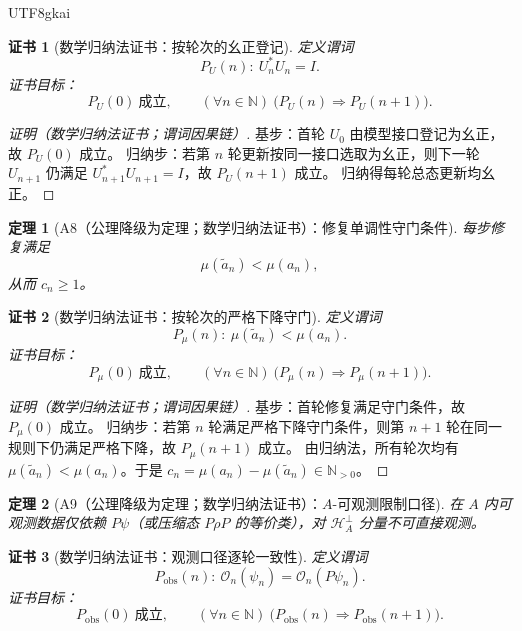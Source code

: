 \documentclass[12pt]{article}
\newtheorem{theorem}{定理}[section]
\newtheorem{Certificate}{证书}[section]
\begin{document}
\begin{CJK*}{UTF8}{gkai}
\begin{Certificate}[数学归纳法证书：按轮次的幺正登记]
\label{cert:A7}
定义谓词
\[
P_U(n):\ U_n^\ast U_n=I.
\]
证书目标：
\[
P_U(0)\ \text{成立},\qquad (\forall n\in\mathbb N)\ \bigl(P_U(n)\Rightarrow P_U(n+1)\bigr).
\]
\end{Certificate}

\begin{proof}[证明（数学归纳法证书；谓词因果链）]
基步：首轮 $U_0$ 由模型接口登记为幺正，故 $P_U(0)$ 成立。
归纳步：若第 $n$ 轮更新按同一接口选取为幺正，则下一轮 $U_{n+1}$ 仍满足 $U_{n+1}^\ast U_{n+1}=I$，故 $P_U(n+1)$ 成立。
归纳得每轮总态更新均幺正。
\end{proof}

\begin{theorem}[A8（公理降级为定理；数学归纳法证书）：修复单调性守门条件]
\label{thm:A8}
每步修复满足
\[
\mu(\tilde a_n)<\mu(a_n),
\]
从而 $c_n\ge 1$。
\end{theorem}

\begin{Certificate}[数学归纳法证书：按轮次的严格下降守门]
\label{cert:A8}
定义谓词
\[
P_\mu(n):\ \mu(\tilde a_n)<\mu(a_n).
\]
证书目标：
\[
P_\mu(0)\ \text{成立},\qquad (\forall n\in\mathbb N)\ \bigl(P_\mu(n)\Rightarrow P_\mu(n+1)\bigr).
\]
\end{Certificate}

\begin{proof}[证明（数学归纳法证书；谓词因果链）]
基步：首轮修复满足守门条件，故 $P_\mu(0)$ 成立。
归纳步：若第 $n$ 轮满足严格下降守门条件，则第 $n+1$ 轮在同一规则下仍满足严格下降，故 $P_\mu(n+1)$ 成立。
由归纳法，所有轮次均有 $\mu(\tilde a_n)<\mu(a_n)$。于是 $c_n=\mu(a_n)-\mu(\tilde a_n)\in\mathbb N_{>0}$。
\end{proof}

\begin{theorem}[A9（公理降级为定理；数学归纳法证书）：$A$-可观测限制口径]
\label{thm:A9}
在 $A$ 内可观测数据仅依赖 $P\psi$（或压缩态 $P\rho P$ 的等价类），对 $\mathcal H_A^\perp$ 分量不可直接观测。
\end{theorem}

\begin{Certificate}[数学归纳法证书：观测口径逐轮一致性]
\label{cert:A9}
定义谓词
\[
P_{\mathrm{obs}}(n):\ \mathcal O_n(\psi_n)=\mathcal O_n(P\psi_n).
\]
证书目标：
\[
P_{\mathrm{obs}}(0)\ \text{成立},\qquad (\forall n\in\mathbb N)\ \bigl(P_{\mathrm{obs}}(n)\Rightarrow P_{\mathrm{obs}}(n+1)
  \bigr).
\]
\end{Certificate}


\end{CJK*}
\end{document}
